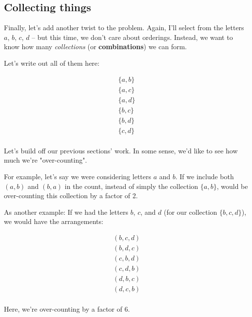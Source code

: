 

\subsection{Collecting things}

Finally, let's add another twist to the problem. Again, I'll select from the letters $a$, $b$, $c$, $d$ -- but this time, we don't care about orderings. Instead, we want to know how many \textit{collections} (or \textbf{combinations}) we can form. 

Let's write out all of them here:

\begin{gather*}
\{a, b\} \\
\{a, c\} \\
\{a, d\} \\
\{b, c\} \\
\{b, d\} \\
\{c, d\} \\
\end{gather*}


Let's build off our previous sections' work. In some sense, we'd like to see how much we're "over-counting". 

For example, let's say we were considering letters $a$ and $b$. If we include both $(a, b)$ and $(b, a)$ in the count, instead of simply the collection $\{a, b\}$, would be over-counting this collection by a factor of 2. 

As another example: If we had the letters $b$, $c$, and $d$ (for our collection $\{b, c, d\}$), we would have the arrangements:

\begin{gather*}
(b, c, d) \\
(b, d, c) \\
(c, b, d) \\
(c, d, b) \\
(d, b, c) \\
(d, c, b) \\
\end{gather*}

Here, we're over-counting by a factor of 6.

